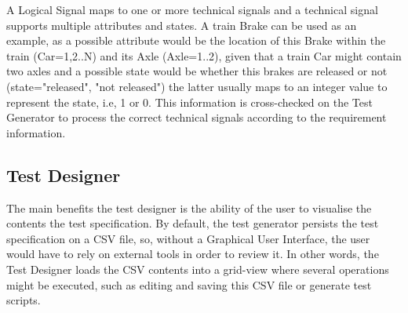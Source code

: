 A Logical Signal maps to one or more technical signals and a technical signal supports multiple attributes and states. A train Brake can be used as an example, as a possible attribute would be the location of this Brake within the train (Car=1,2..N) and its Axle (Axle=1..2), given that a train Car might contain two axles and a possible state would be whether this brakes are released or not (state="released", "not released") the latter usually maps to an integer value to represent the state, i.e, 1 or 0. This information is cross-checked on the Test Generator to process the correct technical signals according to the requirement information.


\subsection{Test Designer}
\label{subsec:method_test_designer}

The main benefits the test designer is the ability of the user to visualise the contents the test specification. By default, the test generator persists the test specification on a CSV file, so, without a Graphical User Interface, the user would have to rely on external tools in order to review it. In other words, the Test Designer loads the CSV contents into a grid-view where several operations might be executed, such as editing and saving this CSV file or generate test scripts.
